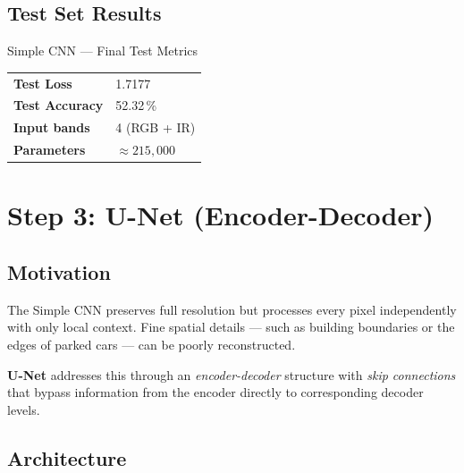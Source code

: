 \documentclass[12pt,a4paper]{article}
\begin{document}
\subsection{Test Set Results}

\begin{resultbox}{Simple CNN — Final Test Metrics}
  \begin{tabular}{ll}
    \textbf{Test Loss}     & 1.7177 \\
    \textbf{Test Accuracy} & 52.32\,\% \\
    \textbf{Input bands}   & 4 (RGB + IR) \\
    \textbf{Parameters}    & $\approx 215{,}000$ \\
  \end{tabular}
\end{resultbox}

\section{Step 3: U-Net (Encoder-Decoder)}

\subsection{Motivation}

The Simple CNN preserves full resolution but processes every pixel independently
with only local context. Fine spatial details — such as building boundaries or
the edges of parked cars — can be poorly reconstructed.

\textbf{U-Net} \cite{ronneberger2015unet} addresses this through an
\emph{encoder-decoder} structure with \emph{skip connections} that bypass
information from the encoder directly to corresponding decoder levels.

\subsection{Architecture}
\end{document}
